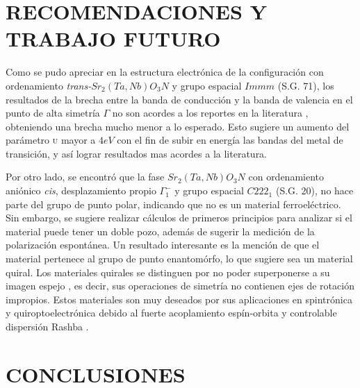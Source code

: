 
\chapter{RECOMENDACIONES Y TRABAJO FUTURO}

Como se pudo apreciar en la estructura electrónica de la configuración con ordenamiento \emph{trans-}$Sr_{2}(Ta,Nb)O_{3}N$ y grupo espacial $Immm$ (S.G. 71), los resultados de la brecha entre la banda de conducción y la banda de valencia en el punto de alta simetría $\Gamma$ no son acordes a los reportes en la literatura \cite{Cen2019OptimizedSplitting,Clarke2002,Bouri2018}, obteniendo una brecha mucho menor a lo esperado. Esto sugiere un aumento del parámetro \textsc{u} mayor a $4eV$ con el fin de subir en energía las bandas del metal de transición, y así lograr resultados mas acordes a la literatura.

Por otro lado, se encontró que la fase $Sr_{2}(Ta,Nb)O_{3}N$ con ordenamiento aniónico \emph{cis}, desplazamiento propio $\Gamma_{1}^{-}$ y grupo espacial $C222_{1}$ (S.G. 20), no hace parte del grupo de punto polar, indicando que no es un material ferroeléctrico. Sin embargo, se sugiere realizar cálculos de primeros principios para analizar si el material puede tener un doble pozo, además de sugerir la medición de la polarización espontánea. Un resultado interesante es la mención de que el material pertenece al grupo de punto enantomórfo, lo que sugiere sea un material quiral. Los materiales quirales se distinguen por no poder superponerse a su imagen espejo
\cite{milic2021Multi}, es decir, sus operaciones de simetría no contienen ejes de rotación impropios. Estos materiales son muy deseados por sus aplicaciones en spintrónica y quiroptoelectrónica debido al fuerte acoplamiento espín-orbita y controlable dispersión Rashba \cite{milic2021Multi}.






\chapter{CONCLUSIONES}

